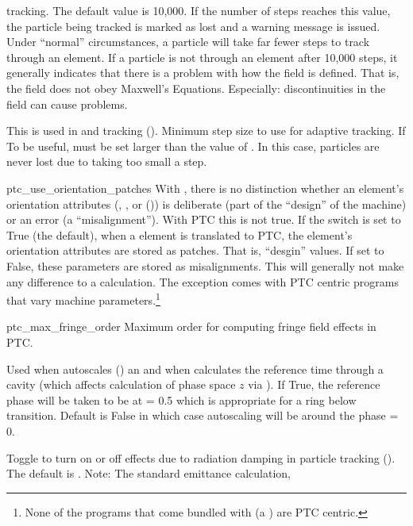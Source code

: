 {\begin{description}
 tracking. The default value is 10,000. If the number of steps reaches this
value, the particle being tracked is marked as lost and a warning message is issued. Under
``normal'' circumstances, a particle will take far fewer steps to track through an element. If a
particle is not through an element after 10,000 steps, it generally indicates that there is a
problem with how the field is defined. That is, the field does not obey Maxwell's
Equations. Especially: discontinuities in the field can cause problems.
%
\item[\vn{min_ds_adaptive_tracking}] \Newline
This is used in  and  tracking (). Minimum step
size to use for adaptive tracking. If To be useful,  must be set
larger than the value of . In this case, particles are never lost
due to taking too small a step.
%
\item{ptc_use_orientation_patches} \Newline
With \bmad, there is no distinction whether an element's orientation attributes (,
, or  ()) is deliberate (part of the ``design'' of the machine)
or an error (a ``misalignment'').  With PTC this is not true. If the 
switch is set to True (the default), when a \bmad element is translated to PTC,
the element's orientation attributes are stored as patches. That is, ``desgin'' values.
If set to False, these parameters are stored as misalignments. This will generally not make any
difference to a calculation. The exception comes with PTC centric programs that vary machine
parameters.\footnote
  {
None of the programs that come bundled with \bmad (a \bmad {}) are
PTC centric.
  }
%
\item{ptc_max_fringe_order} \Newline
Maximum order for computing fringe field effects in PTC. 
%
\item[\vn{rf_phase_below_transition_ref}] \Newline
Used when \bmad autoscales () an  and when \bmad calculates the
reference time through a cavity (which affects calculation of phase space $z$ via ).  If
True, the reference phase will be taken to be at  = 0.5 which is appropriate for a ring
below transition. Default is False in which case autoscaling will be around the phase  = 0.
%
\item[\vn{radiation_damping_on}] \Newline
Toggle to turn on or off effects due to radiation damping in particle tracking
(). The default is . Note: The standard \bmad emittance calculation,

\end{description}}

